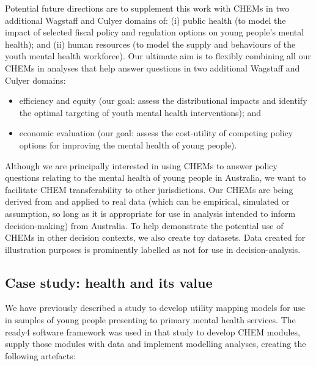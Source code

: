 \documentclass[sn-vancouver,Numbered,pdflatex]{sn-jnl}
\theoremstyle{remark}
\theoremstyle{definition}
\begin{document}
Potential future directions are to supplement this work with CHEMs in two additional Wagstaff and Culyer domains of: (i) public health (to model the impact of selected fiscal policy and regulation options on young people's mental health); and (ii) human resources (to model the supply and behaviours of the youth mental health workforce). Our ultimate aim is to flexibly combining all our CHEMs in analyses that help answer questions in two additional Wagstaff and Culyer domains:

\begin{itemize}
\item
  efficiency and equity (our goal: assess the distributional impacts and identify the optimal targeting of youth mental health interventions); and
\item
  economic evaluation (our goal: assess the cost-utility of competing policy options for improving the mental health of young people).
\end{itemize}

Although we are principally interested in using CHEMs to answer policy questions relating to the mental health of young people in Australia, we want to facilitate CHEM transferability to other jurisdictions. Our CHEMs are being derived from and applied to real data (which can be empirical, simulated or assumption, so long as it is appropriate for use in analysis intended to inform decision-making) from Australia. To help demonstrate the potential use of CHEMs in other decision contexts, we also create toy datasets. Data created for illustration purposes is prominently labelled as not for use in decision-analysis.

\hypertarget{case-study-health-and-its-value}{%
\subsection{Case study: health and its value}\label{case-study-health-and-its-value}}

We have previously described a study \citep{Hamilton2021.07.07.21260129} to develop utility mapping models for use in samples of young people presenting to primary mental health services. The ready4 software framework was used in that study to develop CHEM modules, supply those modules with data and implement modelling analyses, creating the following artefacts:
\end{document}

